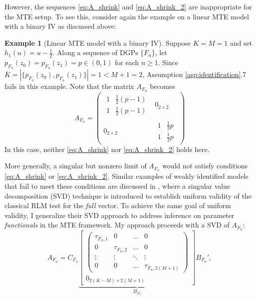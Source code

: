 \documentclass[11pt]{article}
\theoremstyle{definition}
\newtheorem{example}{Example}[section]
\newcommand{\0}{\ensuremath{\mathbf{0}}}
\begin{document}
\begin{bibunit}
However, the sequences \eqref{eq:A_shrink} and \eqref{eq:A_shrink_2} are inappropriate for the MTE setup. To see this, consider again the example on a linear MTE model with a binary IV as discussed above:
\begin{example}[Linear MTE model with a binary IV]
Suppose $K=M=1$ and set $h_{1}(u) = u - \frac{1}{2}$. Along a sequence of DGPs $\{F_n\}$, let $p_{F_n}(z_0) = p_{F_n}(z_1) = p \in (0,1)$ for each $n\geq 1$. Since $\overline{K} = |\{p_{F_n}(z_0), p_{F_n}(z_1)\}| = 1 < M+1 = 2$, Assumption \ref{asp:identification}.7 fails in this example. Note that the matrix $A_{F_n}$ becomes
\[
	A_{F_n} = 
	\begin{pmatrix}
	\begin{matrix}
	1 & \frac{1}{2} (p - 1) \\
	1 & \frac{1}{2} (p - 1)
	\end{matrix} 
	&
	0_{2\times 2} \\
	0_{2\times 2} & 
	\begin{matrix}
	1 & \frac{1}{2}p \\
	1 & \frac{1}{2}p
	\end{matrix}
	\end{pmatrix}
\]
In this case, neither \eqref{eq:A_shrink} nor \eqref{eq:A_shrink_2} holds here.
\end{example}
More generally, a singular but nonzero limit of $A_{F_n}$ would not satisfy conditions \eqref{eq:A_shrink} or \eqref{eq:A_shrink_2}. Similar examples of weakly identified models that fail to meet these conditions are discussed in \cite{andrews/guggenberger:2017}, where a singular value decomposition (SVD) technique is introduced to establish uniform validity of the classical RLM test for the \textit{full} vector. To achieve the same goal of uniform validity, I generalize their SVD approach to address inference on parameter \textit{functionals} in the MTE framework. My approach proceeds with a SVD of $A_{F_n}$:
\[
	A_{F_n} = C_{F_n}
	\underbrace{
	\begin{bmatrix}
		\begin{pmatrix}
			\tau_{F_n,1} & 0 & \ldots & 0 \\
			0 & \tau_{F_n,2} & \ldots & 0 \\
			\vdots & \vdots & \ddots & \vdots \\
			0 & 0 & \ldots & \tau_{F_n, 2(M+1)}
	\end{pmatrix} \\
	0_{2(K-M)\times 2(M+1)}
	\end{bmatrix}}_{\Pi_{F_n}}
	B_{F_n}',
\]
\end{bibunit}
\end{document}
